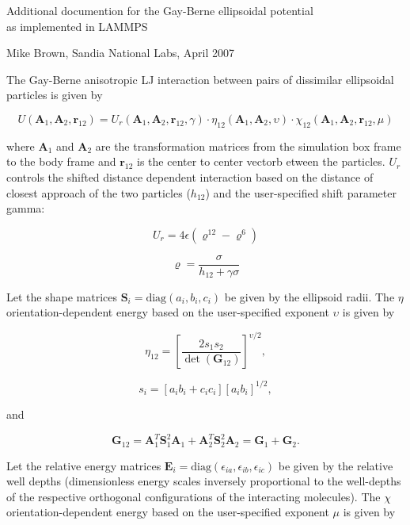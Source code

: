 


\begin{center}

\large{Additional documention for the Gay-Berne ellipsoidal potential \\
  as implemented in LAMMPS}

\end{center}

\centerline{Mike Brown, Sandia National Labs, April 2007}

\vspace{0.3in}

The Gay-Berne anisotropic LJ interaction between pairs of dissimilar
ellipsoidal particles is given by

$$ U ( \mathbf{A}_1, \mathbf{A}_2, \mathbf{r}_{12} ) = U_r (
\mathbf{A}_1, \mathbf{A}_2, \mathbf{r}_{12}, \gamma ) \cdot \eta_{12} (
\mathbf{A}_1, \mathbf{A}_2, \upsilon ) \cdot \chi_{12} ( \mathbf{A}_1,
\mathbf{A}_2, \mathbf{r}_{12}, \mu ) $$

where $\mathbf{A}_1$ and $\mathbf{A}_2$ are the transformation matrices 
from the simulation box frame to the body frame and $\mathbf{r}_{12}$ 
is the center to center vectorb etween the particles.  
$U_r$ controls the shifted distance dependent
interaction based on the distance of closest approach of the two
particles ($h_{12}$) and the user-specified shift parameter gamma:

$$ U_r = 4 \epsilon ( \varrho^{12} - \varrho^6) $$

$$ \varrho = \frac{\sigma}{ h_{12} + \gamma \sigma} $$

Let the shape matrices $\mathbf{S}_i=\mbox{diag}(a_i, b_i, c_i)$ be 
given by the ellipsoid radii. The $\eta$ orientation-dependent energy 
based on the user-specified exponent $\upsilon$ is given by

$$ \eta_{12} = [ \frac{ 2 s_1 s_2 }{\det ( \mathbf{G}_{12} )}]^{
\upsilon / 2 } , $$

$$ s_i = [a_i b_i + c_i c_i][a_i b_i]^{ 1 / 2 }, $$

and

$$ \mathbf{G}_{12} = \mathbf{A}_1^T \mathbf{S}_1^2 \mathbf{A}_1 +
\mathbf{A}_2^T \mathbf{S}_2^2 \mathbf{A}_2 = \mathbf{G}_1 +
\mathbf{G}_2. $$

Let the relative energy matrices $\mathbf{E}_i = \mbox{diag}
(\epsilon_{ia}, \epsilon_{ib}, \epsilon_{ic})$ be given by 
the relative well depths (dimensionless energy scales 
inversely proportional to the well-depths of the respective 
orthogonal configurations of the interacting molecules). The 
$\chi$ orientation-dependent energy based on the user-specified 
exponent $\mu$ is given by

